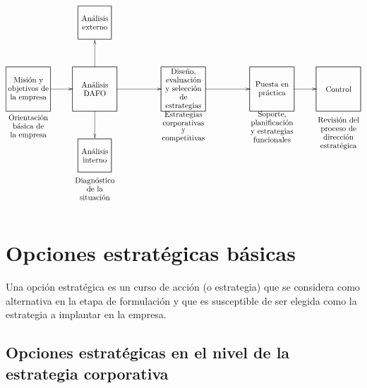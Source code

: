 \documentclass[10pt,a4paper,spanish]{report}
\begin{document}
            \[\begin{xy}
                  ,(-80,-20)*+=[F]=<2cm>[F]\txt<2cm>{Misión y\\objetivos de\\la empresa}
                  ,(-80,-37)*+=[]=<2cm>[]\txt<2cm>{Orientación\\básica de\\la empresa}
                  ,(-50,-20)*+=[F]=<2cm>[F]\txt<2cm>{Análisis\\DAFO}
                  ,(-50,-50)*+=[F]=<1.5cm>[F]\txt<1.5cm>{Análisis\\interno}
                  ,(-50,-65)*+=[]=<2cm>[]\txt<2cm>{Diagnóstico\\de la situación}
                  ,(-50,10)*+=[F]=<1.5cm>[F]\txt<1.5cm>{Análisis\\externo}
                  ,(-10,-20)*+=[F]=<2cm>[F]\txt<2cm>{Diseño,\\evaluación\\y selección\\de estrategias}
                  ,(-10,-37)*+=[]=<2cm>[]\txt<2cm>{Estrategias\\corporativas\\y competitivas}
                  ,(30,-20)*+=[F]=<2cm>[F]\txt<2cm>{Puesta en práctica}
                  ,(30,-37)*+=[]=<2cm>[]\txt<2cm>{Soporte, planificación y estrategias funcionales}
                  ,(60,-20)*+=[F]=<2cm>[F]\txt<2cm>{Control}
                  ,(60,-40)*+=[]=<2cm>[]\txt<2cm>{Revisión del proceso de dirección estratégica}
                  \ar@{->} (-70,-20);(-60,-20)
                  \ar@{->} (-50,-30);(-50,-42)
                  \ar@{->} (-50,-10);(-50,2)
                  \ar@{->} (-40,-20);(-20,-20)
                  \ar@{->} (0,-20);(20,-20)
                  \ar@{->} (40,-20);(50,-20)
            \end{xy}\]

      \section{\textcolor[rgb]{0.4,0.9,0.6}Opciones estratégicas básicas}

            Una opción estratégica es un curso de acción (o estrategia) que se considera como alternativa en la etapa de formulación y que es susceptible de ser elegida como la estrategia a implantar en la empresa.

            \subsection{\textcolor[rgb]{0.4,0.9,0.6}Opciones estratégicas en el nivel de la estrategia corporativa}
\end{document}
